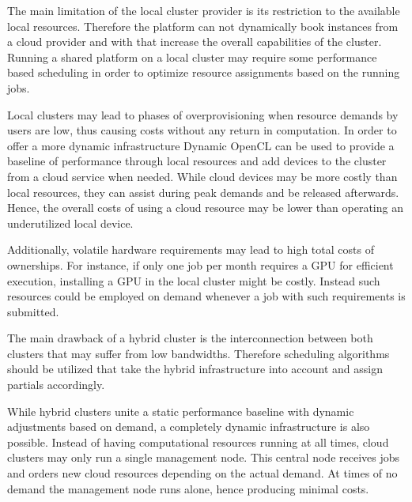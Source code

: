 \begin{description}[style=nextline]
	The main limitation of the local cluster provider is its restriction to the available local resources. Therefore the platform can not dynamically book instances from a cloud provider and with that increase the overall capabilities of the cluster. Running a shared platform on a local cluster may require some performance based scheduling in order to optimize resource assignments based on the running jobs.

	\item[Hybrid Cloud Provider]
	Local clusters may lead to phases of overprovisioning when resource demands by users are low, thus causing costs without any return in computation. In order to offer a more dynamic infrastructure Dynamic OpenCL can be used to provide a baseline of performance through local resources and add devices to the cluster from a cloud service when needed. While cloud devices may be more costly than local resources, they can assist during peak demands and be released afterwards. Hence, the overall costs of using a cloud resource may be lower than operating an underutilized local device.

	Additionally, volatile hardware requirements may lead to high total costs of ownerships. For instance, if only one job per month requires a GPU for efficient execution, installing a GPU in the local cluster might be costly. Instead such resources could be employed on demand whenever a job with such requirements is submitted.

	The main drawback of a hybrid cluster is the interconnection between both clusters that may suffer from low bandwidths. Therefore scheduling algorithms should be utilized that take the hybrid infrastructure into account and assign partials accordingly.

	\item[Cloud Cluster Provider]
	While hybrid clusters unite a static performance baseline with dynamic adjustments based on demand, a completely dynamic infrastructure is also possible. Instead of having computational resources running at all times, cloud clusters may only run a single management node. This central node receives jobs and orders new cloud resources depending on the actual demand. At times of no demand the management node runs alone, hence producing minimal costs.


\end{description}
